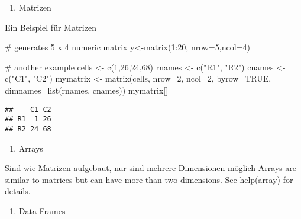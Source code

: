 \documentclass[]{article}
\newenvironment{Shaded}{\begin{snugshade}}{\end{snugshade}}
\newcommand{\KeywordTok}[1]{\textcolor[rgb]{0.94,0.87,0.69}{{#1}}}
\newcommand{\DataTypeTok}[1]{\textcolor[rgb]{0.87,0.87,0.75}{{#1}}}
\newcommand{\DecValTok}[1]{\textcolor[rgb]{0.86,0.86,0.80}{{#1}}}
\newcommand{\StringTok}[1]{\textcolor[rgb]{0.80,0.58,0.58}{{#1}}}
\newcommand{\CommentTok}[1]{\textcolor[rgb]{0.50,0.62,0.50}{{#1}}}
\newcommand{\OtherTok}[1]{\textcolor[rgb]{0.94,0.94,0.56}{{#1}}}
\newcommand{\NormalTok}[1]{\textcolor[rgb]{0.80,0.80,0.80}{{#1}}}
\begin{document}
\begin{enumerate}
\def\labelenumi{\arabic{enumi}.}
\setcounter{enumi}{1}
\itemsep1pt\parskip0pt
\item
  Matrizen
\end{enumerate}

Ein Beispiel für Matrizen

\begin{Shaded}
\begin{Highlighting}[]
\CommentTok{# generates 5 x 4 numeric matrix }
\NormalTok{y<-}\KeywordTok{matrix}\NormalTok{(}\DecValTok{1}\NormalTok{:}\DecValTok{20}\NormalTok{, }\DataTypeTok{nrow=}\DecValTok{5}\NormalTok{,}\DataTypeTok{ncol=}\DecValTok{4}\NormalTok{)}

\CommentTok{# another example}
\NormalTok{cells <-}\StringTok{ }\KeywordTok{c}\NormalTok{(}\DecValTok{1}\NormalTok{,}\DecValTok{26}\NormalTok{,}\DecValTok{24}\NormalTok{,}\DecValTok{68}\NormalTok{)}
\NormalTok{rnames <-}\StringTok{ }\KeywordTok{c}\NormalTok{(}\StringTok{"R1"}\NormalTok{, }\StringTok{"R2"}\NormalTok{)}
\NormalTok{cnames <-}\StringTok{ }\KeywordTok{c}\NormalTok{(}\StringTok{"C1"}\NormalTok{, }\StringTok{"C2"}\NormalTok{) }
\NormalTok{mymatrix <-}\StringTok{ }\KeywordTok{matrix}\NormalTok{(cells, }\DataTypeTok{nrow=}\DecValTok{2}\NormalTok{, }\DataTypeTok{ncol=}\DecValTok{2}\NormalTok{, }\DataTypeTok{byrow=}\OtherTok{TRUE}\NormalTok{,}
  \DataTypeTok{dimnames=}\KeywordTok{list}\NormalTok{(rnames, cnames))}
\NormalTok{mymatrix[]}
\end{Highlighting}
\end{Shaded}

\begin{verbatim}
##    C1 C2
## R1  1 26
## R2 24 68
\end{verbatim}

\begin{enumerate}
\def\labelenumi{(\arabic{enumi})}
\setcounter{enumi}{2}
\itemsep1pt\parskip0pt
\item
  Arrays
\end{enumerate}

Sind wie Matrizen aufgebaut, nur sind mehrere Dimensionen möglich Arrays
are similar to matrices but can have more than two dimensions. See
help(array) for details.

\begin{enumerate}
\def\labelenumi{(\arabic{enumi})}
\setcounter{enumi}{3}
\itemsep1pt\parskip0pt
\item
  Data Frames
\end{enumerate}
\end{document}
